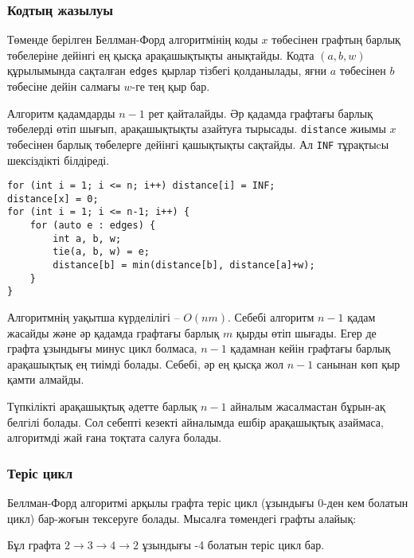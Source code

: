 \subsubsection{Кодтың жазылуы}

Төменде берілген Беллман-Форд алгоритмінің коды $x$ 
төбесінен графтың барлық төбелеріне дейінгі ең қысқа
арақашықтықты анықтайды. Кодта $(a,b,w)$
құрылымында сақталған \texttt{edges} қырлар
тізбегі қолданылады, яғни $a$ төбесінен $b$ төбесіне
дейін салмағы $w$-ге тең қыр бар.

Алгоритм қадамдарды $n-1$ рет қайталайды.
Әр қадамда графтағы барлық төбелерді
өтіп шығып, арақашықтықты азайтуға тырысады.
\texttt{distance} жиымы $x$ төбесінен 
барлық төбелерге дейінгі қашықтықты сақтайды.
Ал \texttt{INF} тұрақтыcы шексіздікті
білдіреді.
\begin{lstlisting}
for (int i = 1; i <= n; i++) distance[i] = INF;
distance[x] = 0;
for (int i = 1; i <= n-1; i++) {
    for (auto e : edges) {
        int a, b, w;
        tie(a, b, w) = e;
        distance[b] = min(distance[b], distance[a]+w);
    }
}
\end{lstlisting}

Алгоритмнің уақытша күрделілігі -- $O(nm)$. 
Себебі алгоритм $n-1$ қадам жасайды және әр қадамда 
графтағы барлық $m$ қырды өтіп шығады.
Егер де графта ұзындығы минус цикл болмаса,
$n-1$ қадамнан кейін графтағы барлық арақашықтық
ең тиімді болады. Себебі, әр ең қысқа жол $n-1$ 
санынан көп қыр қамти алмайды.

Түпкілікті арақашықтық әдетте барлық $n-1$ айналым жасалмастан бұрын-ақ белгілі болады. Сол себепті кезекті айналымда ешбір арақашықтық азаймаса, алгоритмді жай ғана тоқтата салуға болады.

\subsubsection{Теріс цикл}


Беллман-Форд алгоритмі арқылы графта теріс 
цикл (ұзындығы $0$-ден кем болатын цикл) бар-жоғын тексеруге болады.
Мысалға төмендегі графты алайық:

\begin{center}
\end{center}
\noindent
Бұл графта $2 \rightarrow 3 \rightarrow 4 \rightarrow 2$ ұзындығы -4 болатын теріс цикл бар.
 
